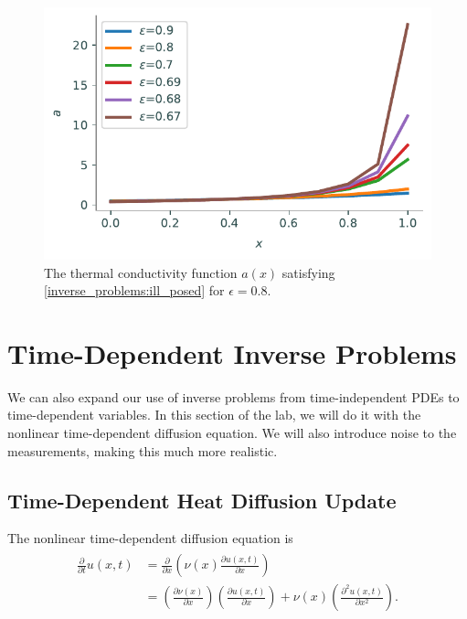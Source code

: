 \begin{figure}[H]
\centering
\includegraphics[width=\textwidth]{figures/ill_posed_density_a.pdf}
\caption{The thermal conductivity function $a(x)$ satisfying \eqref{inverse_problems:ill_posed} for $\epsilon = 0.8$.}
\label{fig:inverse_problems:exercise1}
\end{figure}

\section*{Time-Dependent Inverse Problems}
We can also expand our use of inverse problems from time-independent PDEs to time-dependent variables. In this section of the lab, we will do it with the nonlinear time-dependent diffusion equation. We will also introduce noise to the measurements, making this much more realistic.

\subsection*{Time-Dependent Heat Diffusion Update}
The nonlinear time-dependent diffusion equation is
\begin{align}
\begin{split}
\frac{\partial}{\partial t}u(x,t) &= \frac{\partial}{\partial x}\left(\nu(x)\frac{\partial u(x,t)}{\partial x}\right)\\
&= \left(\frac{\partial\nu(x)}{\partial x}\right)\left(\frac{\partial u(x,t)}{\partial x}\right)+\nu(x)\left(\frac{\partial^2 u(x,t)}{\partial x^2}\right).
\end{split}
\label{eqn:inverse:nonlinear_diffusion}
\end{align}

